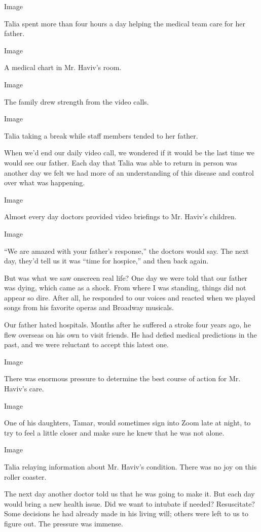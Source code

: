 Image

Talia spent more than four hours a day helping the medical team care for
her father.

Image

A medical chart in Mr. Haviv's room.

Image

The family drew strength from the video calls.

Image

Talia taking a break while staff members tended to her father.

When we'd end our daily video call, we wondered if it would be the last
time we would see our father. Each day that Talia was able to return in
person was another day we felt we had more of an understanding of this
disease and control over what was happening.

Image

Almost every day doctors provided video briefings to Mr. Haviv's
children.

Image

``We are amazed with your father's response,'' the doctors would say.
The next day, they'd tell us it was ``time for hospice,'' and then back
again.

But was what we saw onscreen real life? One day we were told that our
father was dying, which came as a shock. From where I was standing,
things did not appear so dire. After all, he responded to our voices and
reacted when we played songs from his favorite operas and Broadway
musicals.

Our father hated hospitals. Months after he suffered a stroke four years
ago, he flew overseas on his own to visit friends. He had defied medical
predictions in the past, and we were reluctant to accept this latest
one.

Image

There was enormous pressure to determine the best course of action for
Mr. Haviv's care.

Image

One of his daughters, Tamar, would sometimes sign into Zoom late at
night, to try to feel a little closer and make sure he knew that he was
not alone.

Image

Talia relaying information about Mr. Haviv's condition. There was no joy
on this roller coaster.

The next day another doctor told us that he was going to make it. But
each day would bring a new health issue. Did we want to intubate if
needed? Resuscitate? Some decisions he had already made in his living
will; others were left to us to figure out. The pressure was immense.

